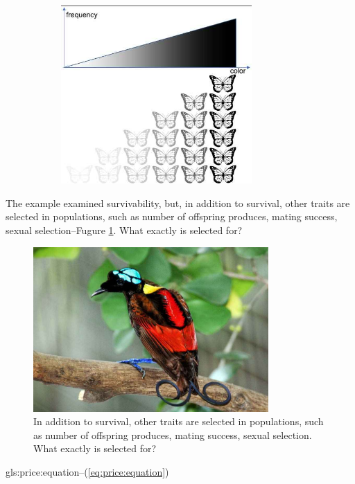\documentclass[]{article}
\begin{document}
\begin{figure}[H]
\begin{subfigure}[t]{0.3\textwidth}
		\includegraphics[width=0.8\textwidth]{SelectionMoths2}
	\end{subfigure}
\end{figure}

The example examined survivability, but, in addition to survival, other traits are selected in populations, such as number of offspring produces, mating success, sexual selection--Fugure \ref{fig:BrightBird}. What exactly is selected for?

\begin{figure}[H]
	\caption[What exactly is selected for?]{In addition to survival, other traits are selected in populations, such as number of offspring produces, mating success, sexual selection. What exactly is selected for?}\label{fig:BrightBird}
	\includegraphics[width=0.8\textwidth]{BrightBird}
\end{figure}
\gls{gls:price:equation}--(\ref{eq:price:equation})
\end{document}
